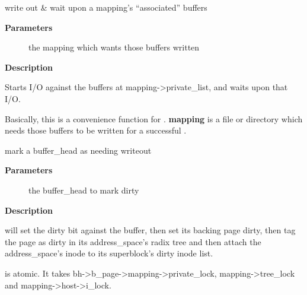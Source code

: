 \documentclass[a4paper,8pt,english]{sphinxmanual}
\begin{document}
\begin{fulllineitems}
\label{filesystems/index:c.sync_mapping_buffers}
write out \& wait upon a mapping's ``associated'' buffers

\end{fulllineitems}


\textbf{Parameters}
\begin{description}
\item[{}] \leavevmode
the mapping which wants those buffers written

\end{description}

\textbf{Description}

Starts I/O against the buffers at mapping-\textgreater{}private\_list, and waits upon
that I/O.

Basically, this is a convenience function for .
\textbf{mapping} is a file or directory which needs those buffers to be written for
a successful .

\begin{fulllineitems}
\label{filesystems/index:c.mark_buffer_dirty}
mark a buffer\_head as needing writeout

\end{fulllineitems}


\textbf{Parameters}
\begin{description}
\item[{}] \leavevmode
the buffer\_head to mark dirty

\end{description}

\textbf{Description}

{\hyperref[filesystems/index:c.mark_buffer_dirty]{\emph{}}} will set the dirty bit against the buffer, then set its
backing page dirty, then tag the page as dirty in its address\_space's radix
tree and then attach the address\_space's inode to its superblock's dirty
inode list.

{\hyperref[filesystems/index:c.mark_buffer_dirty]{\emph{}}} is atomic.  It takes bh-\textgreater{}b\_page-\textgreater{}mapping-\textgreater{}private\_lock,
mapping-\textgreater{}tree\_lock and mapping-\textgreater{}host-\textgreater{}i\_lock.
\end{document}
